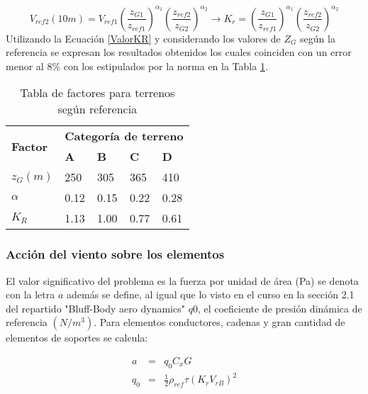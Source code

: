 \begin{equation}\label{ValorKR}
	V_{ref2}(10m)=V_{ref1}\left(\frac{z_{G1}}{z_{ref1}}\right)^{\alpha_1}\left(\frac{z_{ref2}}{z_{G2}}\right)^{\alpha_2}\rightarrow K_r=\left(\frac{z_{G1}}{z_{ref1}}\right)^{\alpha_1}\left(\frac{z_{ref2}}{z_{G2}}\right)^{\alpha_2}
\end{equation}
Utilizando la Ecuación \ref{ValorKR}  y considerando los valores de $Z_G$ según la referencia \cite{Oke2000} se expresan los resultados obtenidos los cuales coinciden con un error menor al $8\%$ con los estipulados por la norma en la Tabla \ref{TablaValoresTerrenos}.

\begin{table}[h] 
	\begin{footnotesize} 
		\begin{center} 
			\begin{tabular}{ |p{3cm}|p{2cm}|p{2cm}|p{2cm}|p{2cm}|} \hline
				\multirow{2}{*}{\textbf{Factor}}  & \multicolumn{4}{|c|}{ \textbf{Categoría de terreno} }  \\ 
				& \textbf{A}& \textbf{B} &\textbf{C}&\textbf{D}\\
				\hline
				$z_G(m)$   & 250     &305&  365 &410\\ \hline
				$\alpha$& 0.12  & 0.15 & 0.22 &0.28\\ \hline
				$K_R$ & 1.13 &1.00 &0.77&  0.61\\ \hline
			\end{tabular}
		\end{center} 
		\caption{Tabla de factores para terrenos según referencia \cite{Davenport1960} }
	\end{footnotesize} 
	\label{TablaValoresTerrenos} 
\end{table}

\subsubsection{Acción del viento sobre los elementos}

El valor significativo del problema es la fuerza por unidad de área (Pa) se denota con la letra $a$ además se define, al igual que lo visto en el curso en la sección 2.1 del repartido "Bluff-Body aero dynamics"  $q0$, el coeficiente de presión dinámica de referencia $(N/m^3)$. Para elementos conductores, cadenas y gran cantidad de elementos de soportes se calcula:

\begin{eqnarray} \label{CoficienteDin1}  
	a&=&q_0C_xG \\\label{CoefDin2}
	q_0&=&\frac{1}{2}\rho_{ref} \tau \left ( K_rV_{rB}\right )^{2}
\end{eqnarray}

